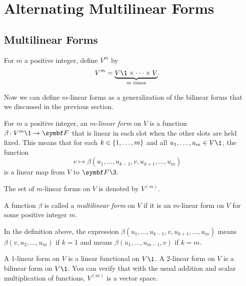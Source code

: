 \CrCom

\section{Alternating Multilinear Forms}  \label{alt_multi}

\subsection{Multilinear Forms}

{For $m$ a positive integer, define $V^m$ by
\[
V^m = \underbrace{V\1 \times \cdots \times V}_{m \text{\ times}}\!.
\]}

Now we can define $m$-linear forms as a generalization of the bilinear forms that we discussed in the previous section.

{\begin{Itemize}
\item
For $m$ a positive integer, an $m$-\emph{linear form} on $V$ is a function $\fun \beta {V^m\1} {\F{}}$ that is linear in each slot when the other slots are held fixed. This means that for each $k \in \{1, \ldots, m\}$ and all $u_1, \ldots, u_m \in V\1$, the function
\[
v \mapsto \beta(u_1, \ldots, u_{k-1}, v, u_{k+1}, \ldots, u_m)
\]
is a linear map from $V$ to $\F{}\3$.
\item
The set of $m$-linear forms on $V$ is denoted by $V^{(m)}\!$.
\item
A function $\beta$ is called a \emph{multilinear form} on $V$ if it is an $m$-linear form on $V$ for some positive integer $m$.
\end{Itemize}
}

In the definition above, the expression $\beta(u_1, \ldots, u_{k-1}, v, u_{k+1}, \ldots, u_m)$ means
$\beta(v, u_2, \ldots, u_m)$ if $k = 1$ and means $\beta(u_1, \ldots, u_{m-1}, v)$ if $k = m$.

A $1$-linear form on $V$ is a linear functional on $V\1$. A $2$-linear form on $V$ is a bilinear form on $V\1$. You can verify that with the usual addition and scalar multiplication of functions, $V^{(m)}$ is a vector space.

